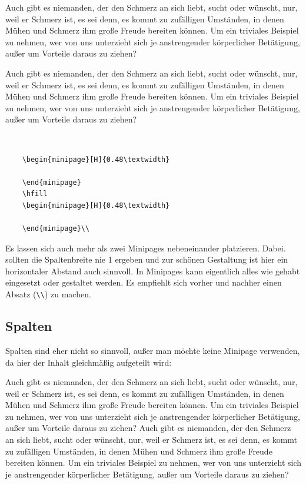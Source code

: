 \begin{minipage}[H]{0.48\textwidth}
	Auch gibt es niemanden, der den Schmerz an sich liebt, sucht oder wünscht, nur, weil er Schmerz ist, es sei denn, es kommt zu zufälligen Umständen, in denen Mühen und Schmerz ihm große Freude bereiten können. Um ein triviales Beispiel zu nehmen, wer von uns unterzieht sich je anstrengender körperlicher Betätigung, außer um Vorteile daraus zu ziehen?
\end{minipage}
\hfill
\begin{minipage}[H]{0.48\textwidth}
	Auch gibt es niemanden, der den Schmerz an sich liebt, sucht oder wünscht, nur, weil er Schmerz ist, es sei denn, es kommt zu zufälligen Umständen, in denen Mühen und Schmerz ihm große Freude bereiten können. Um ein triviales Beispiel zu nehmen, wer von uns unterzieht sich je anstrengender körperlicher Betätigung, außer um Vorteile daraus zu ziehen?
\end{minipage}\\

\begin{verbatim}
    \begin{minipage}[H]{0.48\textwidth}
    	
    \end{minipage}
    \hfill
    \begin{minipage}[H]{0.48\textwidth}
    	
    \end{minipage}\\
\end{verbatim}

Es lassen sich auch mehr als zwei Minipages nebeneinander platzieren. Dabei. sollten die Spaltenbreite nie 1 ergeben und zur schönen Gestaltung ist hier ein horizontaler Abstand auch sinnvoll. In Minipages kann eigentlich alles wie gehabt eingesetzt oder gestaltet werden. Es empfiehlt sich vorher und nachher einen Absatz (\verb|\\|) zu machen.


\subsection{Spalten}

Spalten sind eher nicht so sinnvoll, außer man möchte keine Minipage verwenden, da hier der Inhalt gleichmäßig aufgeteilt wird:

\begin{multicols}{2}
	Auch gibt es niemanden, der den Schmerz an sich liebt, sucht oder wünscht, nur, weil er Schmerz ist, es sei denn, es kommt zu zufälligen Umständen, in denen Mühen und Schmerz ihm große Freude bereiten können. Um ein triviales Beispiel zu nehmen, wer von uns unterzieht sich je anstrengender körperlicher Betätigung, außer um Vorteile daraus zu ziehen? Auch gibt es niemanden, der den Schmerz an sich liebt, sucht oder wünscht, nur, weil er Schmerz ist, es sei denn, es kommt zu zufälligen Umständen, in denen Mühen und Schmerz ihm große Freude bereiten können. Um ein triviales Beispiel zu nehmen, wer von uns unterzieht sich je anstrengender körperlicher Betätigung, außer um Vorteile daraus zu ziehen?
\end{multicols}

